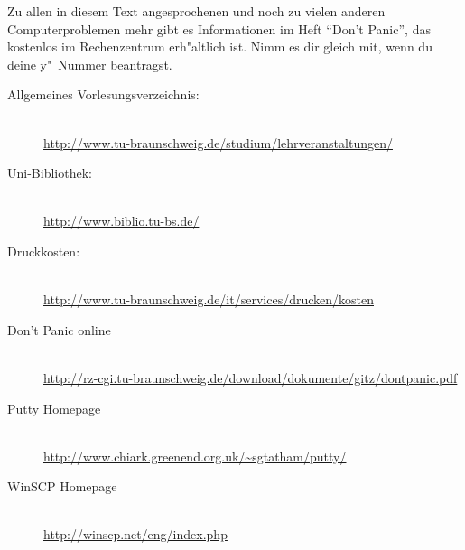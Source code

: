 Zu allen in diesem Text angesprochenen und noch zu vielen anderen
Computerproblemen mehr gibt es Informationen im Heft "`Don't Panic"',
das kostenlos im Rechenzentrum erh"altlich ist. Nimm es dir gleich mit, wenn
du deine y"~Nummer beantragst.

\begin{description}
\item[Allgemeines Vorlesungsverzeichnis:] ~\\
{\footnotesize\url{http://www.tu-braunschweig.de/studium/lehrveranstaltungen/}}
\item[Uni-Bibliothek:] ~\\
{\footnotesize\url{http://www.biblio.tu-bs.de/}}
\item[Druckkosten:] ~\\
{\footnotesize\url{http://www.tu-braunschweig.de/it/services/drucken/kosten}}
\item[Don't Panic online] ~\\
{\footnotesize\url{http://rz-cgi.tu-braunschweig.de/download/dokumente/gitz/dontpanic.pdf}}
\item[Putty Homepage] ~\\
{\footnotesize\url{http://www.chiark.greenend.org.uk/~sgtatham/putty/}}
\item[WinSCP Homepage] ~\\
{\footnotesize\url{http://winscp.net/eng/index.php}}
\end{description}
